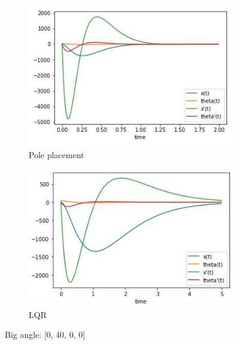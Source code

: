 \documentclass[12pt,letterpaper]{article}
\begin{document}
    \begin{figure}[htb]
        \begin{subfigure}{.5\textwidth}
            \centering
            \includegraphics[width=1\linewidth]{images/output/poles/0-40-0-0.jpg}
            \caption{Pole placement}
            \label{fig:pole_1}
        \end{subfigure}
        \begin{subfigure}{.5\textwidth}
          \centering
          \includegraphics[width=1\linewidth]{images/output/0-40-0-0.jpg}
          \caption{LQR}
        \label{fig:lqr_1}
        \end{subfigure}
    \caption{Big angle: [0, 40, 0, 0]}
    \end{figure}
    
\end{document}
